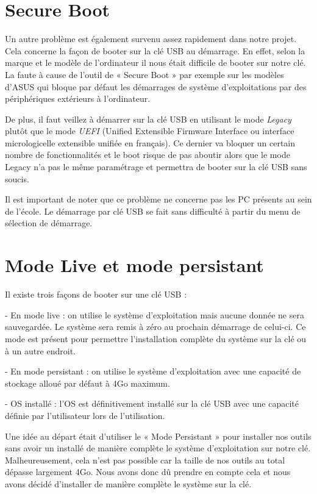 \documentclass[final]{polytech/polytech}
\begin{document}
\section{Secure Boot}
Un autre problème est également survenu assez rapidement dans notre projet. Cela concerne la façon de booter sur la clé USB au démarrage. En effet, selon la marque et le modèle de l’ordinateur il nous était difficile de booter sur notre clé. La faute à cause de l’outil de « Secure Boot » par exemple sur les modèles d’ASUS qui bloque par défaut les démarrages de système d’exploitations par des périphériques extérieurs à l’ordinateur.

De plus, il faut veillez à démarrer sur la clé USB en utilisant le mode \textit{Legacy} plutôt que le mode \textit{UEFI} (Unified Extensible Firmware Interface ou interface micrologicelle extensible unifiée en français). Ce dernier va bloquer un certain nombre de fonctionnalités et le boot risque de pas aboutir alors que le mode Legacy n'a pas le même paramétrage et permettra de booter sur la clé USB sans soucis.

Il est important de noter que ce problème ne concerne pas les PC présents au sein de l’école. Le démarrage par clé USB se fait sans difficulté à partir du menu de sélection de démarrage.

\section{Mode Live et mode persistant}
Il existe trois façons de booter sur une clé USB :

- En mode live : on utilise le système d’exploitation mais aucune donnée ne sera sauvegardée. Le système sera remis à zéro au prochain démarrage de celui-ci. Ce mode est présent pour permettre l’installation complète du système sur la clé ou à un autre endroit.

- En mode persistant : on utilise le système d’exploitation avec une capacité de stockage alloué par défaut à 4Go maximum.

- OS installé : l’OS est définitivement installé sur la clé USB avec une capacité définie par l’utilisateur lors de l’utilisation.

Une idée au départ était d’utiliser le « Mode Persistant » pour installer nos outils sans avoir un installé de manière complète le système d’exploitation sur notre clé. Malheureusement, cela n’est pas possible car la taille de nos outils au total dépasse largement 4Go. Nous avons donc dû prendre en compte cela et nous avons décidé d’installer de manière complète le système sur la clé.
\end{document}
